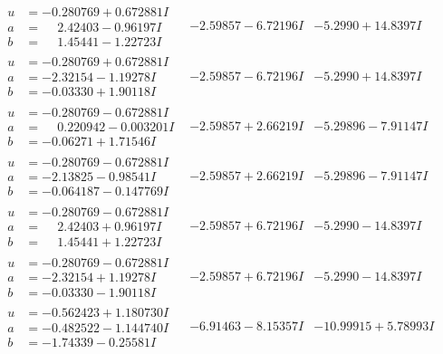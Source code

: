 \documentclass[1p]{elsarticle_modified}
\theoremstyle{definition}
\begin{document}
$$\begin{array}{c|c|c}
\begin{aligned}
u &= -0.280769 + 0.672881 I \\
a &= \phantom{-}2.42403 - 0.96197 I \\
b &= \phantom{-}1.45441 - 1.22723 I\end{aligned}
 & -2.59857 - 6.72196 I & -5.2990 + 14.8397 I \\ \hline\begin{aligned}
u &= -0.280769 + 0.672881 I \\
a &= -2.32154 - 1.19278 I \\
b &= -0.03330 + 1.90118 I\end{aligned}
 & -2.59857 - 6.72196 I & -5.2990 + 14.8397 I \\ \hline\begin{aligned}
u &= -0.280769 - 0.672881 I \\
a &= \phantom{-}0.220942 - 0.003201 I \\
b &= -0.06271 + 1.71546 I\end{aligned}
 & -2.59857 + 2.66219 I & -5.29896 - 7.91147 I \\ \hline\begin{aligned}
u &= -0.280769 - 0.672881 I \\
a &= -2.13825 - 0.98541 I \\
b &= -0.064187 - 0.147769 I\end{aligned}
 & -2.59857 + 2.66219 I & -5.29896 - 7.91147 I \\ \hline\begin{aligned}
u &= -0.280769 - 0.672881 I \\
a &= \phantom{-}2.42403 + 0.96197 I \\
b &= \phantom{-}1.45441 + 1.22723 I\end{aligned}
 & -2.59857 + 6.72196 I & -5.2990 - 14.8397 I \\ \hline\begin{aligned}
u &= -0.280769 - 0.672881 I \\
a &= -2.32154 + 1.19278 I \\
b &= -0.03330 - 1.90118 I\end{aligned}
 & -2.59857 + 6.72196 I & -5.2990 - 14.8397 I \\ \hline\begin{aligned}
u &= -0.562423 + 1.180730 I \\
a &= -0.482522 - 1.144740 I \\
b &= -1.74339 - 0.25581 I\end{aligned}
 & -6.91463 - 8.15357 I & -10.99915 + 5.78993 I \\ \hline\begin{aligned}

\end{aligned}
\end{array}$$
\end{document}
